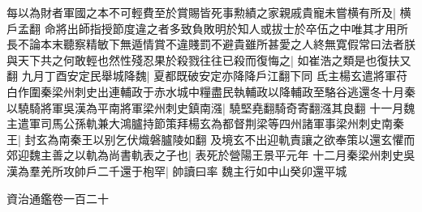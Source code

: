 每以為財者軍國之本不可輕費至於賞賜皆死事勲績之家親戚貴寵未嘗横有所及|{
	横戶孟翻}
命將出師指授節度違之者多致負敗明於知人或拔士於卒伍之中唯其才用所長不論本末聽察精敏下無遁情賞不違賤罰不避貴雖所甚愛之人終無寛假常曰法者朕與天下共之何敢輕也然性殘忍果於殺戮往往已殺而復悔之|{
	如崔浩之類是也復扶又翻}
九月丁酉安定民舉城降魏|{
	夏都既破安定亦降降戶江翻下同}
氐主楊玄遣將軍苻白作圍秦梁州刺史出連輔政于赤水城中糧盡民執輔政以降輔政至駱谷逃還冬十月秦以驍騎將軍吳漢為平南將軍梁州刺史鎮南漒|{
	驍堅堯翻騎奇寄翻漒其良翻}
十一月魏主遣軍司馬公孫軌兼大鴻臚持節策拜楊玄為都督荆梁等四州諸軍事梁州刺史南秦王|{
	封玄為南秦王以别乞伏熾磐臚陵如翻}
及境玄不出迎軌責讓之欲奉策以還玄懼而郊迎魏主善之以軌為尚書軌表之子也|{
	表死於營陽王景平元年}
十二月秦梁州刺史吳漢為羣羌所攻帥戶二千還于枹罕|{
	帥讀曰率}
魏主行如中山癸卯還平城

資治通鑑卷一百二十



















































































